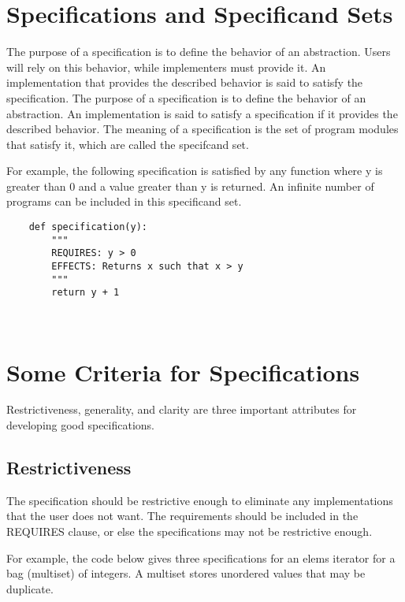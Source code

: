 \documentclass[oneside,11pt,dvipsnames]{book}
\begin{document}
\section{Specifications and Specificand Sets}

The purpose of a specification is to define the behavior of an abstraction. Users will rely on this behavior, while implementers must provide it. An implementation that provides the described behavior is said to satisfy the specification. The purpose of a specification is to define the behavior of an abstraction. An implementation is said to satisfy a specification if it provides the described behavior. The meaning of a specification is the set of program modules that satisfy it, which are called the specifcand set.

For example, the following specification is satisfied by any function where y is greater than 0 and a value greater than y is returned. An infinite number of programs can be included in this specificand set.
\begin{lstlisting}
    def specification(y):
        """
        REQUIRES: y > 0
        EFFECTS: Returns x such that x > y
        """
        return y + 1

    
\end{lstlisting}


\section{Some Criteria for Specifications}
Restrictiveness, generality, and clarity are three important attributes for developing good specifications.

\subsection{Restrictiveness}
The specification should be restrictive enough to eliminate any implementations that the user does not want. The requirements should be included in the REQUIRES clause, or else the specifications may not be restrictive enough.

For example, the code below gives three specifications for an elems iterator for a bag (multiset) of integers. A multiset stores unordered values that may be duplicate.
\end{document}
